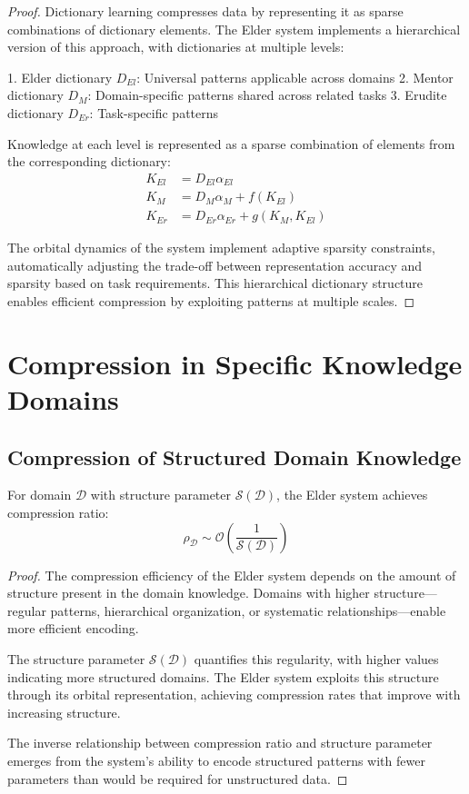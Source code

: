 \begin{proof}
Dictionary learning compresses data by representing it as sparse combinations of dictionary elements. The Elder system implements a hierarchical version of this approach, with dictionaries at multiple levels:

1. Elder dictionary $D_{El}$: Universal patterns applicable across domains
2. Mentor dictionary $D_M$: Domain-specific patterns shared across related tasks
3. Erudite dictionary $D_{Er}$: Task-specific patterns

Knowledge at each level is represented as a sparse combination of elements from the corresponding dictionary:
\begin{align}
K_{El} &= D_{El} \alpha_{El} \\
K_M &= D_M \alpha_M + f(K_{El}) \\
K_{Er} &= D_{Er} \alpha_{Er} + g(K_M, K_{El})
\end{align}

The orbital dynamics of the system implement adaptive sparsity constraints, automatically adjusting the trade-off between representation accuracy and sparsity based on task requirements. This hierarchical dictionary structure enables efficient compression by exploiting patterns at multiple scales.
\end{proof}

\section{Compression in Specific Knowledge Domains}

\subsection{Compression of Structured Domain Knowledge}

\begin{theorem}
For domain $\mathcal{D}$ with structure parameter $\mathcal{S}(\mathcal{D})$, the Elder system achieves compression ratio:
\begin{equation}
\rho_{\mathcal{D}} \sim \mathcal{O}\left(\frac{1}{\mathcal{S}(\mathcal{D})}\right)
\end{equation}
\end{theorem}

\begin{proof}
The compression efficiency of the Elder system depends on the amount of structure present in the domain knowledge. Domains with higher structure—regular patterns, hierarchical organization, or systematic relationships—enable more efficient encoding.

The structure parameter $\mathcal{S}(\mathcal{D})$ quantifies this regularity, with higher values indicating more structured domains. The Elder system exploits this structure through its orbital representation, achieving compression rates that improve with increasing structure.

The inverse relationship between compression ratio and structure parameter emerges from the system's ability to encode structured patterns with fewer parameters than would be required for unstructured data.
\end{proof}

